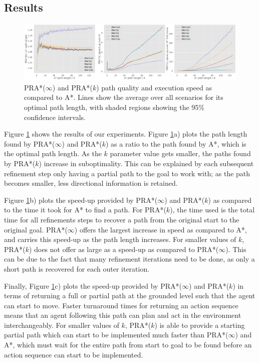 \documentclass[letterpaper]{article} %
\begin{document}
\subsection*{Results}
\begin{figure}[h]
\centering
\includegraphics[width=0.85\paperwidth]{./assets/plot_combined.png}
\caption{
    PRA*($\infty$) and PRA*($k$) path quality and execution speed as compared to A*. 
    Lines show the average over all scenarios for its optimal path length, 
    with shaded regions showing the 95\% confidence intervals.
}
\label{fig_all}
\end{figure}

Figure \ref{fig_all} shows the results of our experiments.
Figure \ref{fig_all}a) plots the path length found by PRA*($\infty$) and PRA*($k$) as a ratio to the path found by A*,
which is the optimal path length.
As the $k$ parameter value gets smaller, the paths found by PRA*($k$) increase in suboptimality.
This can be explained by each subsequent refinement step only having a partial path to the goal to work with;
as the path becomes smaller, less directional information is retained.

Figure \ref{fig_all}b) plots the speed-up provided by PRA*($\infty$) and PRA*($k$) as compared to the time it took for A* to find a path.
For PRA*($k$), the time used is the total time for all refinements steps to recover a path from the original start to the original goal.
PRA*($\infty$) offers the largest increase in speed as compared to A*, and carries this speed-up as the path length increases.
For smaller values of $k$, PRA*($k$) does not offer as large as a speed-up as compared to PRA*($\infty$).
This can be due to the fact that many refinement iterations need to be done, as only a short path is recovered for each outer iteration.

Finally, 
Figure \ref{fig_all}c) plots the speed-up provided by PRA*($\infty$) and PRA*($k$) 
in terms of returning a full or partial path 
at the grounded level such that the agent can start to move.
Faster turnaround times for returning an action sequence means that an agent following this path can plan and act in the environment interchangeably.
For smaller values of $k$, PRA*($k$) is able to provide a starting partial path which can start to be implemented much faster than PRA*($\infty$) and A*,
which must wait for the entire path from start to goal to be found before an action sequence can start to be implemented.
\end{document}
